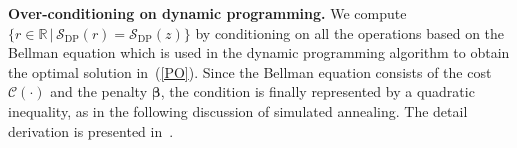 \textbf{Over-conditioning on dynamic programming.}
We compute $\{r \in \mathbb{R} \, | \, \mathcal{S}_{\text{DP}}(r) = \mathcal{S}_{\text{DP}}(z)\}$ %
by conditioning on all the operations based on the Bellman equation 
which is used in the dynamic programming algorithm to obtain the optimal solution in~(\ref{PO}).
Since the Bellman equation consists of the cost $\mathcal{C}(\cdot)$ and the penalty $\bm{\beta}$, the condition is finally represented by a quadratic inequality, as in the following discussion of simulated annealing.
The detail derivation is presented in~\citet{duy2020computing}.

